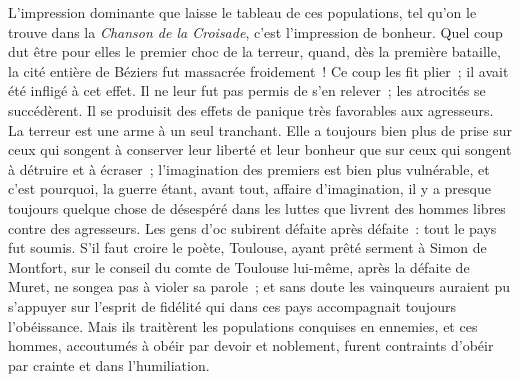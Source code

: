 \documentclass[french,twoside]{book} %
\begin{document}
L'impression dominante que laisse le tableau de ces populations, tel qu'on le trouve dans la {\itshape Chanson de la Croisade}, c'est l'impression de bonheur. Quel coup dut être pour elles le premier choc de la terreur, quand, dès la première bataille, la cité entière de Béziers fut massacrée froidement ! Ce coup les fit plier ; il avait été infligé à cet effet. Il ne leur fut pas permis de s'en relever ; les atrocités se succédèrent. Il se produisit des effets de panique très favora­bles aux agresseurs. La terreur est une arme à un seul tranchant. Elle a toujours bien plus de prise sur ceux qui songent à conserver leur liberté et leur bonheur que sur ceux qui songent à détruire et à écraser ; l'imagination des premiers est bien plus vulnérable, et c'est pourquoi, la guerre étant, avant tout, affaire d'imagination, il y a presque toujours quelque chose de désespéré dans les luttes que livrent des hommes libres contre des agresseurs. Les gens d'oc subirent défaite après défaite : tout le pays fut soumis. S'il faut croire le poète, Toulouse, ayant prêté serment à Simon de Montfort, sur le conseil du comte de Toulouse lui-même, après la défaite de Muret, ne songea pas à violer sa parole ; et sans doute les vainqueurs auraient pu s'appuyer sur l'esprit de fidélité qui dans ces pays accompagnait toujours l'obéissance. Mais ils traitèrent les populations conquises en ennemies, et ces hommes, accoutumés à obéir par devoir et noblement, furent contraints d'obéir par crainte et dans l'humiliation.\par
\end{document}
